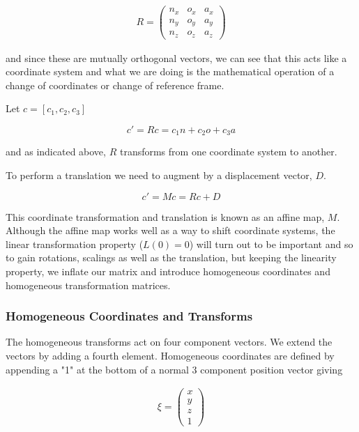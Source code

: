 \[\begin{aligned}
R = \begin{pmatrix}
n_x & o_x & a_x  \\
n_y & o_y & a_y \\
n_z & o_z & a_z  \end{pmatrix}
\end{aligned}\]

and since these are mutually orthogonal vectors, we can see that this
acts like a coordinate system and what we are doing is the mathematical
operation of a change of coordinates or change of reference frame.

Let \(c = [c_1,c_2,c_3]\)

\[c' = Rc = c_1  n + c_2 o + c_3 a\]

and as indicated above, \(R\) transforms from one coordinate system to
another.

To perform a translation we need to augment by a displacement vector,
\(D\).

\[c' = Mc = Rc + D\]

This coordinate transformation and translation is known as an affine
map, \(M\). Although the affine map works well as a way to shift
coordinate systems, the linear transformation property (\(L(0) = 0\))
will turn out to be important and so to gain rotations, scalings as well
as the translation, but keeping the linearity property, we inflate our
matrix and introduce homogeneous coordinates and homogeneous
transformation matrices.

\hypertarget{homogeneous-coordinates-and-transforms}{%
\subsubsection{Homogeneous Coordinates and
Transforms}\label{homogeneous-coordinates-and-transforms}}

The homogeneous transforms act on four component vectors. We extend the
vectors by adding a fourth element. Homogeneous coordinates are defined
by appending a "1" at the bottom of a normal 3 component position vector
giving

\[\begin{aligned}
\xi = \begin{pmatrix}x \\ y \\ z \\ 1 \end{pmatrix}
\end{aligned}\]

